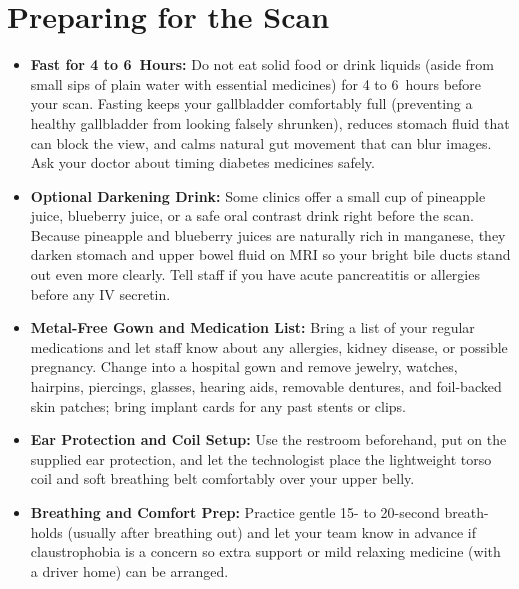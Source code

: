 \section{Preparing for the Scan}
\begin{itemize}
\item \textbf{Fast for 4 to 6~Hours:} Do not eat solid food or drink liquids (aside from small sips of plain water with essential medicines) for 4 to 6~hours before your scan. Fasting keeps your gallbladder comfortably full (preventing a healthy gallbladder from looking falsely shrunken), reduces stomach fluid that can block the view, and calms natural gut movement that can blur images. Ask your doctor about timing diabetes medicines safely.
\item \textbf{Optional Darkening Drink:} Some clinics offer a small cup of pineapple juice, blueberry juice, or a safe oral contrast drink right before the scan. Because pineapple and blueberry juices are naturally rich in manganese, they darken stomach and upper bowel fluid on MRI so your bright bile ducts stand out even more clearly. Tell staff if you have acute pancreatitis or allergies before any IV secretin.
\item \textbf{Metal-Free Gown and Medication List:} Bring a list of your regular medications and let staff know about any allergies, kidney disease, or possible pregnancy. Change into a hospital gown and remove jewelry, watches, hairpins, piercings, glasses, hearing aids, removable dentures, and foil-backed skin patches; bring implant cards for any past stents or clips.
\item \textbf{Ear Protection and Coil Setup:} Use the restroom beforehand, put on the supplied ear protection, and let the technologist place the lightweight torso coil and soft breathing belt comfortably over your upper belly.
\item \textbf{Breathing and Comfort Prep:} Practice gentle 15- to 20-second breath-holds (usually after breathing out) and let your team know in advance if claustrophobia is a concern so extra support or mild relaxing medicine (with a driver home) can be arranged.
\end{itemize}

